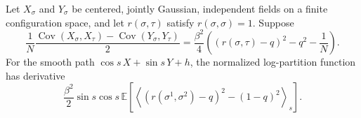 \begin{lemma}
  \label{lem:sg-tal:trig-smart-path-derivative}
  \leanok
{}
Let $X_\sigma$ and $Y_\sigma$ be centered, jointly Gaussian, independent fields on a finite
configuration space, and let $r(\sigma,\tau)$ satisfy $r(\sigma,\sigma)=1$.  Suppose
\[
\frac1N\frac{\operatorname{Cov}(X_\sigma,X_\tau)-
  \operatorname{Cov}(Y_\sigma,Y_\tau)}2
= \frac{\beta^2}{4}\left((r(\sigma,\tau)-q)^2-q^2-\frac1N\right).
\]
For the smooth path $\cos s\,X+\sin s\,Y+h$, the normalized log-partition function has
derivative
\[
\frac{\beta^2}{2}\sin s\cos s\,
\mathbb{E}[\left\langle (r(\sigma^1,\sigma^2)-q)^2-(1-q)^2\right\rangle_s].
\]
\end{lemma}
